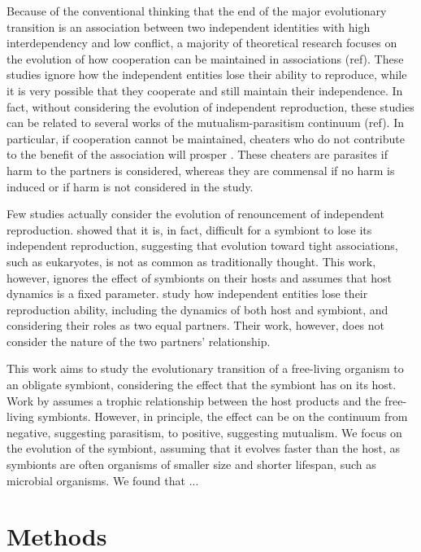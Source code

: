 \documentclass[11pt]{article}
\begin{document}
Because of the conventional thinking that the end of the major evolutionary transition is an association between two independent identities with high interdependency and low conflict, a majority of theoretical research focuses on the evolution of how cooperation can be maintained in associations (ref).
These studies ignore how the independent entities lose their ability to reproduce, while it is very possible that they cooperate and still maintain their independence. 
In fact, without considering the evolution of independent reproduction, these studies can be related to several works of the mutualism-parasitism continuum (ref).
In particular, if cooperation cannot be maintained, cheaters who do not contribute to the benefit of the association will prosper \citep{szathmary:Nature:1995}.
These cheaters are parasites if harm to the partners is considered, whereas they are commensal if no harm is induced or if harm is not considered in the study.


Few studies actually consider the evolution of renouncement of independent reproduction. 
\citet{nguyen:PLoSOne:2020} showed that it is, in fact, difficult for a symbiont to lose its independent reproduction, suggesting that evolution toward tight associations, such as eukaryotes, is not as common as traditionally thought.
This work, however, ignores the effect of symbionts on their hosts and assumes that host dynamics is a fixed parameter.
\citet{athreya:AmNAt:2025} study how independent entities lose their reproduction ability, including the dynamics of both host and symbiont, and considering their roles as two equal partners.
Their work, however, does not consider the nature of the two partners' relationship.

This work aims to study the evolutionary transition of a free-living organism to an obligate symbiont, considering the effect that the symbiont has on its host.
Work by \citep{krishnan} assumes a trophic relationship between the host products and the free-living symbionts.
However, in principle, the effect can be on the continuum from negative, suggesting parasitism, to positive, suggesting mutualism.
We focus on the evolution of the symbiont, assuming that it evolves faster than the host, as symbionts are often organisms of smaller size and shorter lifespan, such as microbial organisms.
We found that ...


\section*{Methods}
\end{document}
